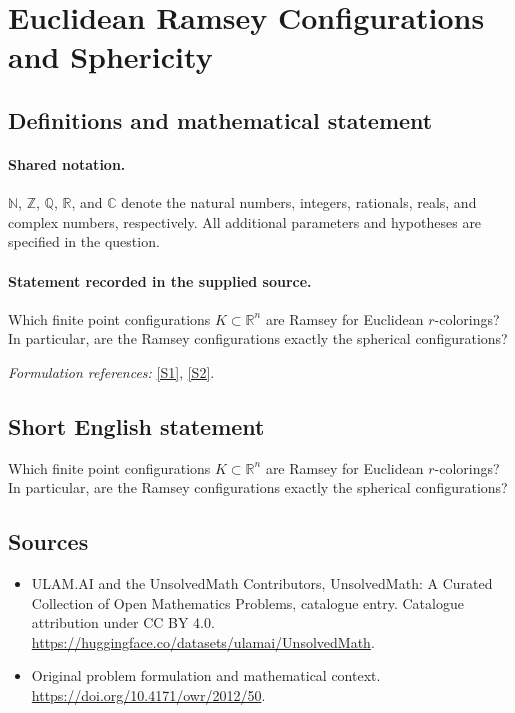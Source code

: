 \documentclass[11pt]{article}
\newcommand{\sref}[2]{\hyperlink{source:#1:#2}{[S#2]}}
\begin{document}
\section{Euclidean Ramsey Configurations and Sphericity}\label{statement}

\subsection{Definitions and mathematical statement}

\paragraph{Shared notation.}$\mathbb N$, $\mathbb Z$, $\mathbb Q$, $\mathbb R$, and $\mathbb C$ denote the natural numbers, integers, rationals, reals, and complex numbers, respectively. All additional parameters and hypotheses are specified in the question.


\paragraph{Statement recorded in the supplied source.}
Which finite point configurations $K\subset\mathbb R^n$ are Ramsey for Euclidean $r$-colorings? In particular, are the Ramsey configurations exactly the spherical configurations?
\par\smallskip\textit{Formulation references:} \sref{statement}{1}, \sref{statement}{2}.
\subsection{Short English statement}
Which finite point configurations $K\subset\mathbb R^n$ are Ramsey for Euclidean $r$-colorings? In particular, are the Ramsey configurations exactly the spherical configurations?
\subsection{Sources}
\begin{itemize}
\item[\hypertarget{source:statement:1}{S1}] ULAM.AI and the UnsolvedMath Contributors, UnsolvedMath: A Curated Collection of Open Mathematics Problems, catalogue entry. Catalogue attribution under CC BY 4.0.
\url{https://huggingface.co/datasets/ulamai/UnsolvedMath}.
\item[\hypertarget{source:statement:2}{S2}] Original problem formulation and mathematical context.
\url{https://doi.org/10.4171/owr/2012/50}.
\end{itemize}
\label{end:statement}
\end{document}
